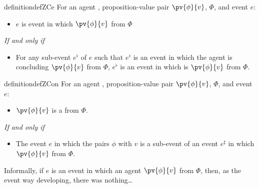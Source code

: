 \begin{note}
    \begin{restatable}[\sCe{2}]{definition}{defZCe}
    \label{def:sCe}
    For an agent \vAgent{}, proposition-value pair \(\pv{\phi}{v}\), \poP{} \(\Phi\), and event \(e\):

    \begin{itemize}
    \item
      \(e\) is event in which \vAgent{} \emph{\sCe{}} \(\pv{\phi}{v}\) from \(\Phi\)
    \end{itemize}

    \emph{If and only if}

    \begin{itemize}
    \item
      For any sub-event \(e^{\flat}\) of \(e\) such that \(e^{\flat}\) is an event in which the agent is concluding \(\pv{\phi}{v}\) from \(\Phi\), \(e^{\flat}\) is an event in which \vAgent{} is \sCing{} \(\pv{\phi}{v}\) from \(\Phi\).
    \end{itemize}
    \vspace{-\baselineskip}
  \end{restatable}

    \begin{restatable}[\sCon{2}]{definition}{defZCon}
    \label{def:sCon}
    For an agent \vAgent{}, proposition-value pair \(\pv{\phi}{v}\), \poP{} \(\Phi\), and event \(e\):

    \begin{itemize}
    \item
      \(\pv{\phi}{v}\) is a \emph{\sCon{}} from \(\Phi\).
    \end{itemize}

    \emph{If and only if}

    \begin{itemize}
    \item
      The event \(e\) in which the \vAgent{} pairs \(\phi\) with \(v\) is a sub-event of an event \(e^{\sharp}\) in which \vAgent{}  \(\pv{\phi}{v}\) from \(\Phi\).
    \end{itemize}
    \vspace{-\baselineskip}
  \end{restatable}
\end{note}

\begin{note}
  Informally, if \(e\) is an event in which an agent \sCe{} \(\pv{\phi}{v}\) from \(\Phi\), then, as the event way developing, there was nothing\dots
\end{note}

